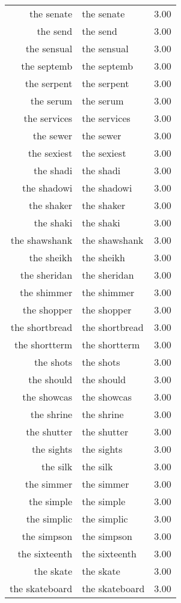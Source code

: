 \begin{table}[ht]
\begin{tabular}{rlr}
  the senate & the senate & 3.00 \\ 
  the send & the send & 3.00 \\ 
  the sensual & the sensual & 3.00 \\ 
  the septemb & the septemb & 3.00 \\ 
  the serpent & the serpent & 3.00 \\ 
  the serum & the serum & 3.00 \\ 
  the services & the services & 3.00 \\ 
  the sewer & the sewer & 3.00 \\ 
  the sexiest & the sexiest & 3.00 \\ 
  the shadi & the shadi & 3.00 \\ 
  the shadowi & the shadowi & 3.00 \\ 
  the shaker & the shaker & 3.00 \\ 
  the shaki & the shaki & 3.00 \\ 
  the shawshank & the shawshank & 3.00 \\ 
  the sheikh & the sheikh & 3.00 \\ 
  the sheridan & the sheridan & 3.00 \\ 
  the shimmer & the shimmer & 3.00 \\ 
  the shopper & the shopper & 3.00 \\ 
  the shortbread & the shortbread & 3.00 \\ 
  the shortterm & the shortterm & 3.00 \\ 
  the shots & the shots & 3.00 \\ 
  the should & the should & 3.00 \\ 
  the showcas & the showcas & 3.00 \\ 
  the shrine & the shrine & 3.00 \\ 
  the shutter & the shutter & 3.00 \\ 
  the sights & the sights & 3.00 \\ 
  the silk & the silk & 3.00 \\ 
  the simmer & the simmer & 3.00 \\ 
  the simple & the simple & 3.00 \\ 
  the simplic & the simplic & 3.00 \\ 
  the simpson & the simpson & 3.00 \\ 
  the sixteenth & the sixteenth & 3.00 \\ 
  the skate & the skate & 3.00 \\ 
  the skateboard & the skateboard & 3.00 \\ 

\end{tabular}
\end{table}
